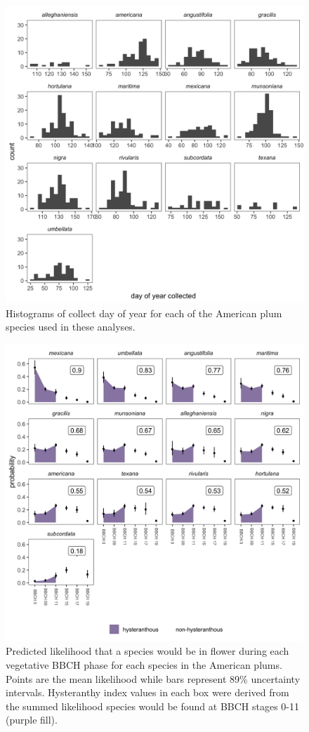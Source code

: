\documentclass{article}[11pt]
\begin{document}
\begin{figure}[h!]
    \centering
 \includegraphics[width=.5\textwidth]{..//..//Plots/whatReviwerswant/seasonal_distrbn.jpeg}
   
     \caption{Histograms of collect day of year for each of the American plum species used in these analyses.}
      \label{fig:bias}
\end{figure}


\begin{figure}[h!]
    \centering
 \includegraphics[width=.7\textwidth]{..//..//Plots/whatReviwerswant/sps_preds_nodoy4supp.jpeg}
    \caption{Predicted likelihood that a species would be in flower during each vegetative BBCH phase for each species in the American plums. Points are the mean likelihood while bars represent 89\% uncertainty intervals. Hysteranthy index values in each box were derived from the summed likelihood  species would be found at BBCH stages 0-11 (purple fill).}
    \label{fig:nodoy}
\end{figure}
\end{document}
